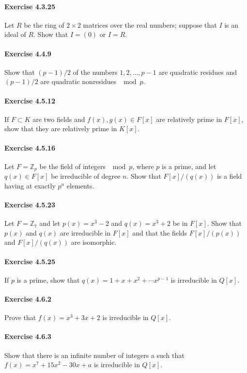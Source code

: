 \documentclass{article}
\begin{document}
\paragraph{Exercise 4.3.25} Let $R$ be the ring of $2 \times 2$ matrices over the real numbers; suppose that $I$ is an ideal of $R$. Show that $I = (0)$ or $I = R$.

\paragraph{Exercise 4.4.9} Show that $(p - 1)/2$ of the numbers $1, 2, \ldots, p - 1$ are quadratic residues and $(p - 1)/2$ are quadratic nonresidues $\mod p$.

\paragraph{Exercise 4.5.12} If $F \subset K$ are two fields and $f(x), g(x) \in F[x]$ are relatively prime in $F[x]$, show that they are relatively prime in $K[x]$.

\paragraph{Exercise 4.5.16} Let $F = \mathbb{Z}_p$ be the field of integers $\mod p$, where $p$ is a prime, and let $q(x) \in F[x]$ be irreducible of degree $n$. Show that $F[x]/(q(x))$ is a field having at exactly $p^n$ elements.

\paragraph{Exercise 4.5.23} Let $F = \mathbb{Z}_7$ and let $p(x) = x^3 - 2$ and $q(x) = x^3 + 2$ be in $F[x]$. Show that $p(x)$ and $q(x)$ are irreducible in $F[x]$ and that the fields $F[x]/(p(x))$ and $F[x]/(q(x))$ are isomorphic.

\paragraph{Exercise 4.5.25} If $p$ is a prime, show that $q(x) = 1 + x + x^2 + \cdots x^{p - 1}$ is irreducible in $Q[x]$.

\paragraph{Exercise 4.6.2} Prove that $f(x) = x^3 + 3x + 2$ is irreducible in $Q[x]$.

\paragraph{Exercise 4.6.3} Show that there is an infinite number of integers a such that $f(x) = x^7 + 15x^2 - 30x + a$ is irreducible in $Q[x]$.
\end{document}
